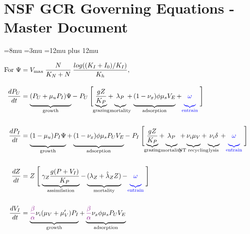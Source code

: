 \documentclass{article}
\begin{document}
\section*{NSF GCR Governing Equations - Master Document}

\thinmuskip=8mu
\medmuskip=3mu
\thickmuskip=12mu plus 12mu
 
\begin{align}
    \textrm{For } \Psi &= V_{\textrm{max}} \: \frac{N}{K_N + N} \: \frac{log((K_I + I_0)/K_I)}{K_{h}}, \\[10pt]
    \frac{dP_U}{dt} &= \underbrace{\vphantom{\frac{g Z}{K_P}} (P_U + \mu_u P_I) \Psi}_{\textrm{growth}} 
    -  \; P_U \: \Biggl[ \;\underbrace{\frac{g Z}{K_P}}_{\mathclap{\textrm{grazing}}} 
    + \underbrace{\vphantom{\frac{g Z}{K_P}} \lambda_P}_{\mathclap{\textrm{mortality}}} 
    + \underbrace{\vphantom{\frac{g Z}{K_P}} (1 - \nu_x) \phi \mu_s V_E }_{\textrm{adsorption}}
    + {\color{blue} \underbrace{\vphantom{\frac{g Z}{K_P}} \omega}_{\textrm{entrain}}} \;\Biggr] \\[15pt]
    \frac{dP_I}{dt} &= \underbrace{  (1 - \mu_u) P_I \Psi \biggr. }_{\textrm{growth}} 
    + \underbrace{ \biggl. (1 - \nu_x) \phi \mu_s P_U V_E }_{\textrm{adsorption}} 
    - \; P_I \: \Biggl[\; \underbrace{\vphantom{\frac{g Z}{K_P}} \frac{g Z}{K_P}}_{\mathclap{\textrm{grazing}}} 
    + \underbrace{\vphantom{\frac{g Z}{K_P}} \lambda_P}_{\mathclap{\textrm{mortality}}} \;
    + \underbrace{\vphantom{\frac{g Z}{K_P}} \nu_{i}  \mu_V}_{\mathclap{\textrm{NT recycling}}} 
    + \underbrace{\vphantom{\frac{g Z}{K_P}} \nu_i \delta}_{\textrm{lysis}} 
    + {\color{blue}\underbrace{\vphantom{\frac{g Z}{K_P}} \omega}_{\textrm{entrain}}} \; \Biggr] \\[15pt]
    \frac{dZ}{dt} &= Z \: \Biggl[\; \underbrace{ \gamma_Z \frac{g (P+V_I)}{K_P} }_{\textrm{assimilation}} 
    - \underbrace{\vphantom{\gamma_Z \frac{g (P+V_I)}{K_P}} (\lambda_Z + \hat{\lambda}_Z Z)}_{\textrm{mortality}} 
    - {\color{blue}\underbrace{\vphantom{\gamma_Z \frac{g (P+V_I)}{K_P}} \omega}_{\textrm{entrain}}} \;\Biggr]\\[15pt]
    \frac{dV_I}{dt} &= \underbrace{\vphantom{\frac{g Z}{K_P}} \textcolor{Plum}{\frac{\beta}{\alpha}} \nu_{i} ( \mu_V + \mu_V' ) P_I}_{\textrm{growth}} + \underbrace{\vphantom{\frac{g Z}{K_P}} \textcolor{Plum}{\frac{\beta}{\alpha}} \nu_x \phi \mu_s P_U V_E}_{\textrm{adsorption}} 

\end{align}
\end{document}
